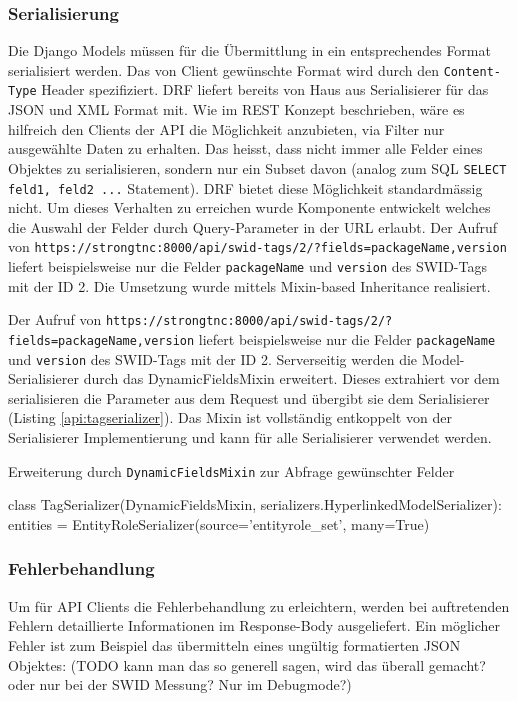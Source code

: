 \subsubsection{Serialisierung}
\label{api:serialisierung}
Die Django Models müssen für die Übermittlung in ein entsprechendes Format serialisiert werden.
Das von Client gewünschte Format wird durch den \texttt{Content-Type} Header spezifiziert. DRF liefert bereits von Haus aus Serialisierer für das JSON und XML Format mit.
Wie im REST Konzept beschrieben, wäre es hilfreich den Clients der API die Möglichkeit anzubieten, via Filter nur ausgewählte Daten zu erhalten.
Das heisst, dass nicht immer alle Felder eines Objektes zu serialisieren, sondern nur ein Subset davon (analog zum SQL \texttt{SELECT feld1, feld2 ...} Statement).
DRF bietet diese Möglichkeit standardmässig nicht. 
Um dieses Verhalten zu erreichen wurde Komponente entwickelt welches die Auswahl der Felder durch Query-Parameter in der URL erlaubt.
Der Aufruf von \texttt{https://strongtnc:8000/api/swid-tags/2/?fields=packageName,version} liefert beispielsweise nur die Felder \texttt{packageName} und \texttt{version} des SWID-Tags mit der ID 2. Die Umsetzung wurde mittels Mixin-based Inheritance\cite{bracha1990mixin} realisiert.

Der Aufruf von \texttt{https://strongtnc:8000/api/swid-tags/2/?fields=packageName,version} liefert beispielsweise nur die Felder \texttt{packageName} und \texttt{version} des SWID-Tags mit der ID 2.
Serverseitig werden die Model-Serialisierer durch das DynamicFieldsMixin erweitert. Dieses extrahiert vor dem serialisieren die Parameter aus dem Request und übergibt sie dem Serialisierer (Listing \ref{api:tagserializer}). Das Mixin ist vollständig entkoppelt von der Serialisierer Implementierung und kann für alle Serialisierer verwendet werden.

\begin{listing}
\caption{Erweiterung durch \texttt{DynamicFieldsMixin} zur Abfrage gewünschter Felder}
\label{api:tagserializer}
\begin{pythoncode}
class TagSerializer(DynamicFieldsMixin, serializers.HyperlinkedModelSerializer):
    entities = EntityRoleSerializer(source='entityrole_set', many=True)
\end{pythoncode}
\end{listing}

\subsubsection{Fehlerbehandlung}
Um für API Clients die Fehlerbehandlung zu erleichtern, werden bei auftretenden Fehlern detaillierte Informationen im Response-Body ausgeliefert. 
Ein möglicher Fehler ist zum Beispiel das übermitteln eines ungültig formatierten JSON Objektes: (TODO kann man das so generell sagen, wird das überall gemacht? oder nur bei der SWID Messung? Nur im Debugmode?)

